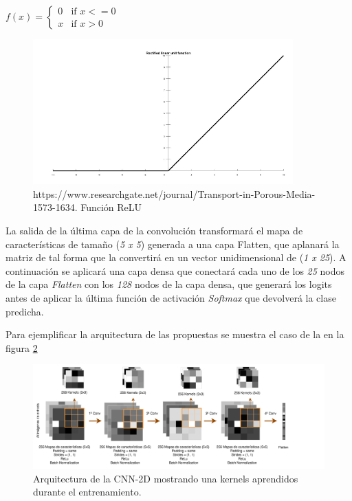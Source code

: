            \begin{center}
                $f(x) = \left\{
                               \begin{array}{lr}
                                 0 & \text{if } x<=0\\
                                 x & \text{if } x>0
                               \end{array}
                        \right.$
            \end{center}

            \begin{figure}[h]
                \centering
                \includegraphics[width=10cm]{archivos/4.Metodologia/Modelos/CNN/RELUImage}
                \caption{https://www.researchgate.net/journal/Transport-in-Porous-Media-1573-1634. Función ReLU}
                \label{RELUImage}
             \end{figure}

            La salida de la última capa de la convolución transformará el mapa de características de tamaño (\textit{5 x 5}) generada a una capa Flatten, que aplanará la matriz de tal forma que la convertirá en un vector unidimensional de (\textit{1 x 25}). A continuación se aplicará una capa densa que conectará cada uno de los \textit{25} nodos de la capa \textit{Flatten} con los \textit{128} nodos de la capa densa, que generará los logits antes de aplicar la última función de activación \textit{Softmax} que devolverá la clase predicha.


            Para ejemplificar la arquitectura de las  propuestas se muestra el caso de la  en la figura \ref{TASPCNNIMAGE}


            \begin{figure}[h]
                \centering
                \includegraphics[width=17cm]{archivos/4.Metodologia/Modelos/CNN/2D/TASPCNN}
                \caption{Arquitectura de la CNN-2D mostrando una  kernels aprendidos durante el entrenamiento.}
                \label{TASPCNNIMAGE}
             \end{figure}


